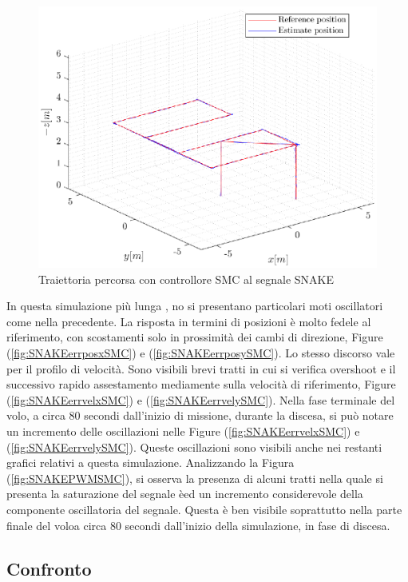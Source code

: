 \begin{figure}
	\centering
	\includegraphics[width=1\textwidth]{Simulazioni/Figure/SMC/SNAKE/Trajectory}
	\caption{Traiettoria percorsa con controllore SMC al segnale SNAKE}
	\label{fig:SNAKEtraSMC}
\end{figure}

In questa simulazione più lunga , no si presentano particolari moti oscillatori come nella precedente. La risposta in termini di posizioni è molto fedele al riferimento, con scostamenti solo in prossimità dei cambi di direzione, Figure (\ref{fig:SNAKEerrposxSMC}) e (\ref{fig:SNAKEerrposySMC}). Lo stesso discorso vale per il profilo di velocità. Sono visibili brevi tratti in cui si verifica overshoot e il successivo rapido assestamento mediamente sulla velocità di riferimento, Figure (\ref{fig:SNAKEerrvelxSMC}) e (\ref{fig:SNAKEerrvelySMC}). Nella fase terminale del volo, a circa 80 secondi dall'inizio di missione, durante la discesa, si può notare un incremento delle oscillazioni nelle Figure (\ref{fig:SNAKEerrvelxSMC}) e (\ref{fig:SNAKEerrvelySMC}). Queste oscillazioni sono visibili anche nei restanti grafici relativi a questa simulazione. Analizzando la Figura (\ref{fig:SNAKEPWMSMC}), si osserva la presenza di alcuni tratti nella quale si presenta la saturazione del segnale èed un incremento considerevole della componente oscillatoria del segnale. Questa è ben visibile soprattutto nella parte finale del voloa circa 80 secondi dall'inizio della simulazione, in fase di discesa.

\clearpage

\subsection{Confronto}

